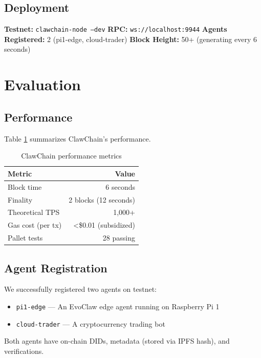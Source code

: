 \documentclass{article}
\begin{document}
\subsection{Deployment}

\textbf{Testnet:} \texttt{clawchain-node --dev}  
\textbf{RPC:} \texttt{ws://localhost:9944}  
\textbf{Agents Registered:} 2 (pi1-edge, cloud-trader)  
\textbf{Block Height:} 50+ (generating every 6 seconds)

\section{Evaluation}\label{sec:evaluation}

\subsection{Performance}

Table \ref{tab:performance} summarizes ClawChain's performance.

\begin{table}[h]
\centering
\begin{tabular}{lr}
\toprule
\textbf{Metric} & \textbf{Value} \\
\midrule
Block time & 6 seconds \\
Finality & 2 blocks (12 seconds) \\
Theoretical TPS & 1,000+ \\
Gas cost (per tx) & <\$0.01 (subsidized) \\
Pallet tests & 28 passing \\
\bottomrule
\end{tabular}
\caption{ClawChain performance metrics}
\label{tab:performance}
\end{table}

\subsection{Agent Registration}

We successfully registered two agents on testnet:
\begin{itemize}
    \item \texttt{pi1-edge} — An EvoClaw edge agent running on Raspberry Pi 1
    \item \texttt{cloud-trader} — A cryptocurrency trading bot
\end{itemize}

Both agents have on-chain DIDs, metadata (stored via IPFS hash), and verifications.
\end{document}
